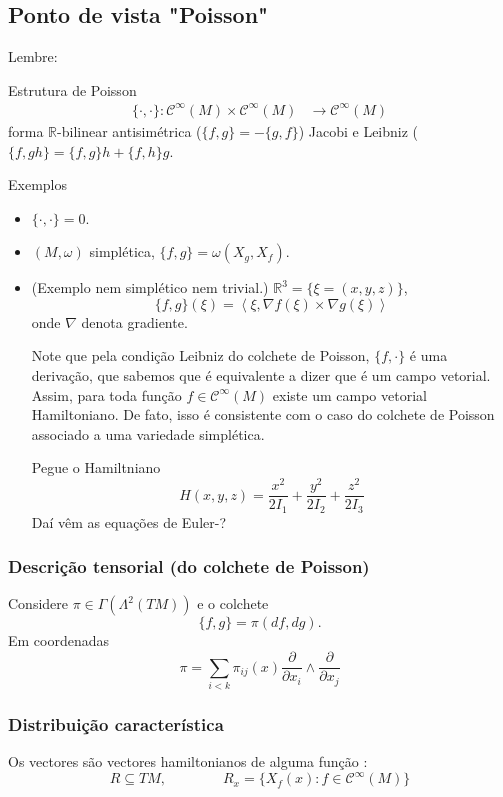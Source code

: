 \subsection{Ponto de vista "Poisson"}

Lembre:
 \begin{thing7}{Estrutura de Poisson}\leavevmode
 	\begin{align*}
 		\{\cdot,\cdot\}: \mathcal{C}^\infty(M)\times \mathcal{C}^\infty(M) &\longrightarrow \mathcal{C}^\infty(M)
 	\end{align*}
	forma $ \mathbb{R}$-bilinear antisimétrica ($\{f,g\} =-\{g,f\}$) Jacobi e Leibniz ($\{f,gh\} =\{f,g\} h+\{f,h\} g$.
 \end{thing7}

\begin{thing6}{Exemplos}\leavevmode
	\begin{itemize}
	\item $\{\cdot,\cdot\} =0$.
	\item $(M,\omega)$ simplética, $\{f,g\} =\omega(X_g,X_f)$.
	\item (Exemplo nem simplético nem trivial.) $\mathbb{R}^{3}=\{\xi=(x,y,z)\}$,
		\[\{f,g\}(\xi)=\left<\xi,\nabla f(\xi)\times \nabla g(\xi)\right> \]
		onde $\nabla$ denota gradiente.

		Note que pela condição Leibniz do colchete de Poisson, $\{f,\cdot\}$ é uma derivação, que sabemos que é equivalente a dizer que é um campo vetorial. Assim, para toda função $f\in\mathcal{C}^\infty(M)$ existe um campo vetorial Hamiltoniano. De fato, isso é consistente com o caso do colchete de Poisson associado a uma variedade simplética.

		Pegue o Hamiltniano
		\[H(x,y,z)=\frac{x^2}{2I_1}+\frac{y^2}{2I_2}+\frac{z^2}{2I_3}\]
		Daí vêm as equações de Euler-?
	\end{itemize}
\end{thing6}

\subsubsection{Descrição tensorial (do colchete de Poisson)}

Considere $\pi \in\Gamma(\Lambda^{2}(TM))$ e o colchete
\[\{f,g\} =\pi(df,dg).\]
Em coordenadas
\[\pi=\sum_{i<k}\pi_{ij}(x)\frac{\partial }{\partial x_i}\wedge \frac{\partial }{\partial x_j}\]

\subsubsection{Distribuição característica}
Os vectores são vectores  hamiltonianos de alguma função :
\[R\subseteq TM,\qquad \qquad R_x=\{X_f(x):f\in\mathcal{C}^\infty(M)\}\]

